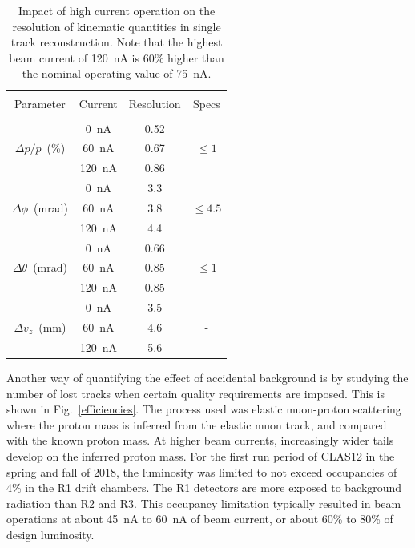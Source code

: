 \documentclass[final,3p,twocolumn]{elsarticle}
\begin{document}
\begin{table}[htbp!]
\caption{Impact of high current operation on the resolution of kinematic quantities in single track reconstruction. Note
that the highest beam current of 120~nA is 60\% higher than the nominal operating value of 75~nA.}     
\label{resolution}
\vspace{0.2cm}
\begin{tabular}{|c|c|c|c|} \hline
&&&\\
Parameter & Current & Resolution &Specs\\
&&&\\ \hline
& 0~nA  & 0.52 & \\
$\Delta{p}/p$~(\%) &60~nA &  0.67& $\le 1$\\
& 120~nA &  0.86 &  \\ \hline 
&0~nA &  3.3 &  \\
$\Delta \phi$~(mrad)& 60~nA &  3.8 &  $\le 4.5$\\
&120~nA  & 4.4 &  \\ \hline
&0~nA &  0.66 &  \\
$\Delta \theta$~(mrad)& 60~nA &  0.85 &  $\le 1$\\
&120~nA  & 0.85 &  \\ \hline
& 0~nA & 3.5 &  \\
$\Delta{v_z}$~(mm) & 60~nA & 4.6 & -  \\
& 120~nA & 5.6 & \\ \hline
\end{tabular}
\end{table}

Another way of quantifying the effect of accidental background is by studying the number of lost tracks when
certain quality requirements are imposed. This is shown in Fig.~\ref{efficiencies}. The process used was elastic
muon-proton scattering where the proton mass is inferred from the elastic muon track, and compared with the
known proton mass. At higher beam currents, increasingly wider tails develop on the inferred proton mass. For the 
first run period of CLAS12 in the spring and fall of 2018, the luminosity was limited to not exceed occupancies of
4\% in the R1 drift chambers. The R1 detectors are more exposed to background radiation than R2 and R3. This
occupancy limitation typically resulted in beam operations at about 45~nA to 60~nA of beam current, or about
60\% to 80\% of design luminosity.
\end{document}
